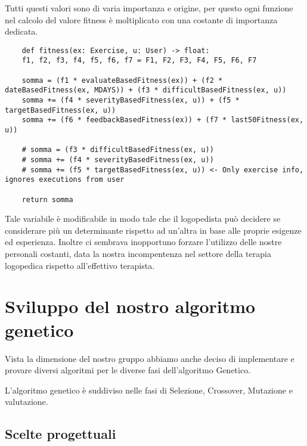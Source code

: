 \documentclass{article}
\begin{document}
\pagebreak

Tutti questi valori sono di varia importanza e origine, per questo ogni funzione nel calcolo del valore fitness è moltiplicato con una costante di importanza dedicata.
\begin{lstlisting}
    def fitness(ex: Exercise, u: User) -> float:
    f1, f2, f3, f4, f5, f6, f7 = F1, F2, F3, F4, F5, F6, F7

    somma = (f1 * evaluateBasedFitness(ex)) + (f2 * dateBasedFitness(ex, MDAYS)) + (f3 * difficultBasedFitness(ex, u))
    somma += (f4 * severityBasedFitness(ex, u)) + (f5 * targetBasedFitness(ex, u))
    somma += (f6 * feedbackBasedFitness(ex)) + (f7 * last50Fitness(ex, u))

    # somma = (f3 * difficultBasedFitness(ex, u))
    # somma += (f4 * severityBasedFitness(ex, u))
    # somma += (f5 * targetBasedFitness(ex, u)) <- Only exercise info, ignores executions from user

    return somma
\end{lstlisting}

Tale variabile è modificabile in modo tale che il logopedista può decidere se considerare più un determinante rispetto ad un'altra in base alle proprie esigenze ed esperienza. Inoltre ci sembrava inopportuno forzare l'utilizzo delle nostre personali costanti, data la nostra incompentenza nel settore della terapia logopedica rispetto all'effettivo terapista.

\pagebreak


\section{Sviluppo del nostro algoritmo genetico}

Vista la dimensione del nostro gruppo abbiamo anche deciso di implementare e provare diversi algoritmi per le diverse fasi dell'algoritmo Genetico.

L'algoritmo genetico è suddiviso nelle fasi di Selezione, Crossover, Mutazione e valutazione.

\subsection{Scelte progettuali}
\end{document}
